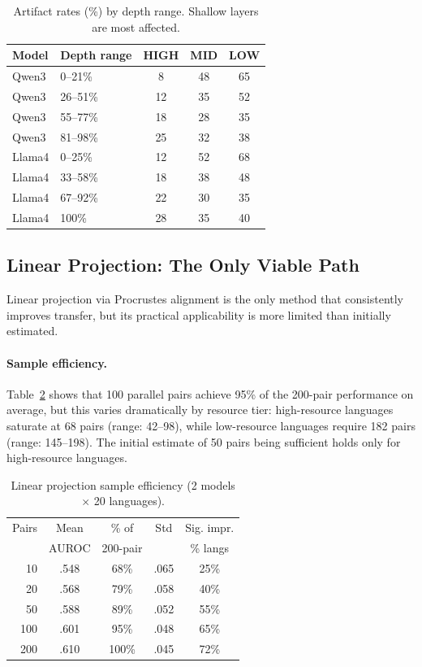 \documentclass[11pt,a4paper]{article}
\newcommand{\auroc}{AUROC}
\begin{document}
\begin{table}[t]
\centering
\small
\caption{Artifact rates (\%) by depth range. Shallow layers are most affected.}
\label{tab:layer_artifacts}
\begin{tabular}{llccc}
\toprule
Model & Depth range & HIGH & MID & LOW \\
\midrule
Qwen3 & 0--21\% & 8 & 48 & 65 \\
Qwen3 & 26--51\% & 12 & 35 & 52 \\
Qwen3 & 55--77\% & 18 & 28 & 35 \\
Qwen3 & 81--98\% & 25 & 32 & 38 \\
\midrule
Llama4 & 0--25\% & 12 & 52 & 68 \\
Llama4 & 33--58\% & 18 & 38 & 48 \\
Llama4 & 67--92\% & 22 & 30 & 35 \\
Llama4 & 100\% & 28 & 35 & 40 \\
\bottomrule
\end{tabular}
\end{table}

\subsection{Linear Projection: The Only Viable Path}
\label{sec:linear_proj}

Linear projection via Procrustes alignment is the only method that consistently improves transfer, but its practical applicability is more limited than initially estimated.

\paragraph{Sample efficiency.}
Table~\ref{tab:sample_efficiency} shows that 100 parallel pairs achieve 95\% of the 200-pair performance on average, but this varies dramatically by resource tier: high-resource languages saturate at 68 pairs (range: 42--98), while low-resource languages require 182 pairs (range: 145--198).
The initial estimate of 50 pairs being sufficient holds only for high-resource languages.

\begin{table}[t]
\centering
\small
\caption{Linear projection sample efficiency (2 models $\times$ 20 languages).}
\label{tab:sample_efficiency}
\begin{tabular}{rcccc}
\toprule
Pairs & Mean & \% of & Std & Sig. impr. \\
      & \auroc{} & 200-pair & & \% langs \\
\midrule
10  & .548 & 68\% & .065 & 25\% \\
20  & .568 & 79\% & .058 & 40\% \\
50  & .588 & 89\% & .052 & 55\% \\
100 & .601 & 95\% & .048 & 65\% \\
200 & .610 & 100\% & .045 & 72\% \\
\bottomrule
\end{tabular}
\end{table}
\end{document}
